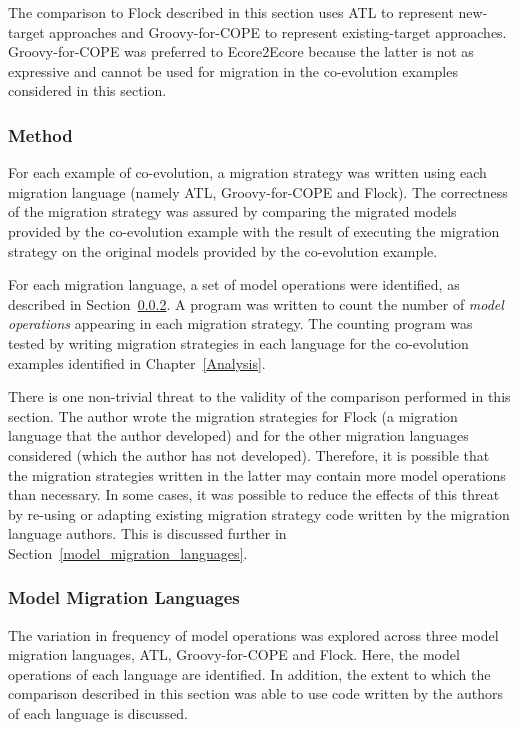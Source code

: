The comparison to Flock described in this section uses ATL to represent new-target approaches and Groovy-for-COPE to represent existing-target approaches. Groovy-for-COPE was preferred to Ecore2Ecore because the latter is not as expressive and cannot be used for migration in the co-evolution examples considered in this section.

\subsubsection{Method}
For each example of co-evolution, a migration strategy was written using each migration language (namely ATL, Groovy-for-COPE and Flock). The correctness of the migration strategy was assured by comparing the migrated models provided by the co-evolution example with the result of executing the migration strategy on the original models provided by the co-evolution example.

For each migration language, a set of model operations were identified, as described in Section~\ref{subsec:model_migration_languages}. A program was written to count the number of \emph{model operations} appearing in each migration strategy. The counting program was tested by writing migration strategies in each language for the co-evolution examples identified in Chapter~\ref{Analysis}.

There is one non-trivial threat to the validity of the comparison performed in this section. The author wrote the migration strategies for Flock (a migration language that the author developed) and for the other migration languages considered (which the author has not developed). Therefore, it is possible that the migration strategies written in the latter may contain more model operations than necessary. In some cases, it was possible to reduce the effects of this threat by re-using or adapting existing migration strategy code written by the migration language authors. This is discussed further in Section~\ref{model_migration_languages}.


\subsubsection{Model Migration Languages}
\label{subsec:model_migration_languages}
The variation in frequency of model operations was explored across three model migration languages, ATL, Groovy-for-COPE and Flock. Here, the model operations of each language are identified. In addition, the extent to which the comparison described in this section was able to use code written by the authors of each language is discussed.

